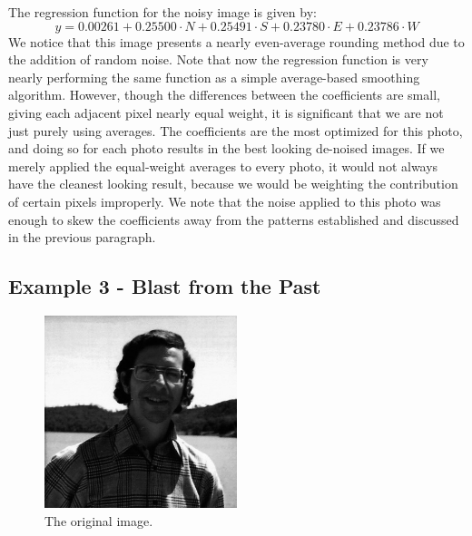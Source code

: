 \documentclass{article}
\begin{document}
The regression function for the noisy image is given by:
\begin{equation}
y = 0.00261 + 0.25500 \cdot N + 0.25491 \cdot S + 0.23780 \cdot E + 0.23786 \cdot W
\end{equation}
We notice that this image presents a nearly even-average rounding method due to the addition of random noise.  Note that now the regression function is very nearly performing the same function as a simple average-based smoothing algorithm.  However, though the differences between the coefficients are small, giving each adjacent pixel nearly equal weight, it is significant that we are not just purely using averages.  The coefficients are the most optimized for this photo, and doing so for each photo results in the best looking de-noised images.  If we merely applied the equal-weight averages to every photo, it would not always have the cleanest looking result, because we would be weighting the contribution of certain pixels improperly.  We note that the noise applied to this photo was enough to skew the coefficients away from the patterns established and discussed in the previous paragraph.

\subsection{Example 3 - Blast from the Past}

\begin{figure}[H]
    \begin{center}
        \includegraphics[width=0.5\textwidth]{matloff.jpg}
    \end{center}
  \caption{The original image.}
\end{figure}
\end{document}
